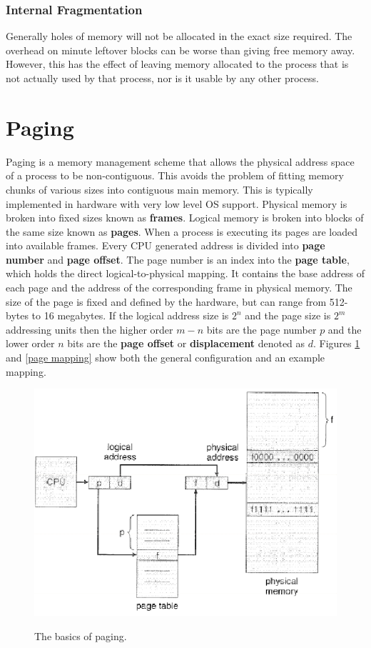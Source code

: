 \documentclass[10pt,a4paper]{article}
\begin{document}
\subsubsection{Internal Fragmentation}
Generally holes of memory will not be allocated in the exact size required. The overhead on minute leftover blocks can be worse than giving free memory away. However, this has the effect of leaving memory allocated to the process that is not actually used by that process, nor is it usable by any other process. 
\section{Paging}
Paging is a memory management scheme that allows the physical address space of a process to be non-contiguous. This avoids the problem of fitting memory chunks of various sizes into contiguous main memory. This is typically implemented in hardware with very low level OS support. Physical memory is broken into fixed sizes known as {\bf frames}. Logical memory is broken into blocks of the same size known as {\bf pages}. When a process is executing its pages are loaded into available frames. Every CPU generated address is divided into {\bf page number} and {\bf page offset}. The page number is an index into the {\bf page table}, which holds the direct logical-to-physical mapping. It contains the base address of each page and the address of the corresponding frame in physical memory. The size of the page is fixed and defined by the hardware, but can range from 512-bytes to 16 megabytes. 
\newline\newline
If the logical address size is $2^n$ and the page size is $2^m$ addressing units then the higher order $m-n$ bits are the page number $p$ and the lower order $n$ bits are the {\bf page offset} or {\bf displacement} denoted as $d$. Figures \ref{paging} and \ref{page mapping} show both the general configuration and an example mapping. 
\begin{figure}
\caption{The basics of paging.\cite{OSCONCEPTS}}
\begin{center}
\includegraphics[scale=0.5]{../images/paging.png}
\label{paging}
\end{center}
\end{figure}
\end{document}
